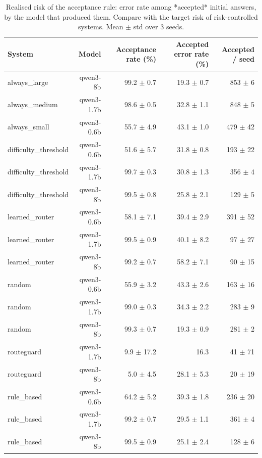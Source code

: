 \begin{table}[t]
\centering
\small
\caption{Realised risk of the acceptance rule: error rate among *accepted* initial answers, by the model that produced them. Compare with the target risk of risk-controlled systems. Mean $\pm$ std over 3 seeds.}
\label{tab:acceptance}
\begin{tabular}{lrrrr}
\toprule
System & Model & Acceptance rate (\%) & Accepted error rate (\%) & Accepted / seed \\
\midrule
always\_large & qwen3-8b & 99.2 $\pm$ 0.7 & 19.3 $\pm$ 0.7 & 853 $\pm$ 6 \\
always\_medium & qwen3-1.7b & 98.6 $\pm$ 0.5 & 32.8 $\pm$ 1.1 & 848 $\pm$ 5 \\
always\_small & qwen3-0.6b & 55.7 $\pm$ 4.9 & 43.1 $\pm$ 1.0 & 479 $\pm$ 42 \\
difficulty\_threshold & qwen3-0.6b & 51.6 $\pm$ 5.7 & 31.8 $\pm$ 0.8 & 193 $\pm$ 22 \\
difficulty\_threshold & qwen3-1.7b & 99.7 $\pm$ 0.3 & 30.8 $\pm$ 1.3 & 356 $\pm$ 4 \\
difficulty\_threshold & qwen3-8b & 99.5 $\pm$ 0.8 & 25.8 $\pm$ 2.1 & 129 $\pm$ 5 \\
learned\_router & qwen3-0.6b & 58.1 $\pm$ 7.1 & 39.4 $\pm$ 2.9 & 391 $\pm$ 52 \\
learned\_router & qwen3-1.7b & 99.5 $\pm$ 0.9 & 40.1 $\pm$ 8.2 & 97 $\pm$ 27 \\
learned\_router & qwen3-8b & 99.2 $\pm$ 0.7 & 58.2 $\pm$ 7.1 & 90 $\pm$ 15 \\
random & qwen3-0.6b & 55.9 $\pm$ 3.2 & 43.3 $\pm$ 2.6 & 163 $\pm$ 16 \\
random & qwen3-1.7b & 99.0 $\pm$ 0.3 & 34.3 $\pm$ 2.2 & 283 $\pm$ 9 \\
random & qwen3-8b & 99.3 $\pm$ 0.7 & 19.3 $\pm$ 0.9 & 281 $\pm$ 2 \\
routeguard & qwen3-1.7b & 9.9 $\pm$ 17.2 & 16.3 & 41 $\pm$ 71 \\
routeguard & qwen3-8b & 5.0 $\pm$ 4.5 & 28.1 $\pm$ 5.3 & 20 $\pm$ 19 \\
rule\_based & qwen3-0.6b & 64.2 $\pm$ 5.2 & 39.3 $\pm$ 1.8 & 236 $\pm$ 20 \\
rule\_based & qwen3-1.7b & 99.2 $\pm$ 0.7 & 29.5 $\pm$ 1.1 & 361 $\pm$ 4 \\
rule\_based & qwen3-8b & 99.5 $\pm$ 0.9 & 25.1 $\pm$ 2.4 & 128 $\pm$ 6 \\
\bottomrule
\end{tabular}
\end{table}
